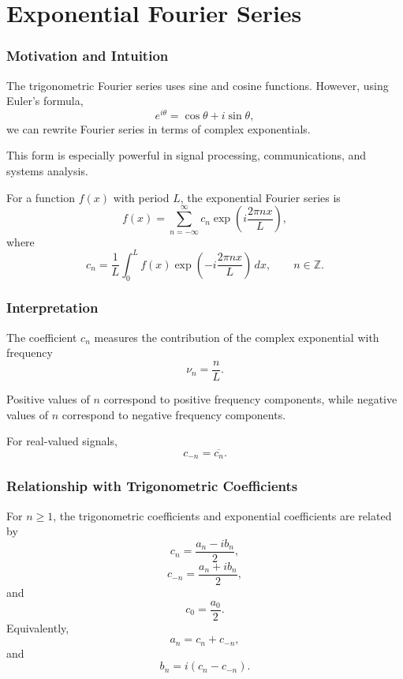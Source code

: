 \section{Exponential Fourier Series}

\subsubsection*{Motivation and Intuition}

The trigonometric Fourier series uses sine and cosine functions. However, using Euler's formula,
\[
    e^{i\theta}=\cos\theta+i\sin\theta,
\]
we can rewrite Fourier series in terms of complex exponentials.

This form is especially powerful in signal processing, communications, and systems analysis.

\begin{conceptbox}
    For a function $f(x)$ with period $L$, the exponential Fourier series is
    \[
        f(x)=\sum_{n=-\infty}^{\infty}
        c_n \exp\left(i\frac{2\pi n x}{L}\right),
    \]
    where
    \[
        c_n=\frac{1}{L}\int_0^L
        f(x)\exp\left(-i\frac{2\pi n x}{L}\right)\,dx,
        \qquad n\in\mathbb{Z}.
    \]
\end{conceptbox}

\subsubsection*{Interpretation}

The coefficient $c_n$ measures the contribution of the complex exponential with frequency
\[
    \nu_n=\frac{n}{L}.
\]

Positive values of $n$ correspond to positive frequency components, while negative values of $n$ correspond to negative frequency components.

For real-valued signals,
\[
    c_{-n}=\overline{c_n}.
\]

\subsubsection*{Relationship with Trigonometric Coefficients}

\begin{conceptbox}
    For $n\geq 1$, the trigonometric coefficients and exponential coefficients are related by
    \[
        c_n=\frac{a_n-ib_n}{2},
    \]
    \[
        c_{-n}=\frac{a_n+ib_n}{2},
    \]
    and
    \[
        c_0=\frac{a_0}{2}.
    \]
    Equivalently,
    \[
        a_n=c_n+c_{-n},
    \]
    and
    \[
        b_n=i(c_n-c_{-n}).
    \]
\end{conceptbox}

